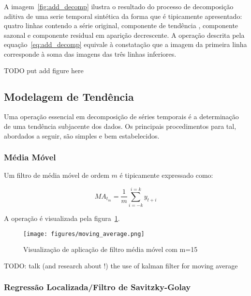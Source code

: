A imagem~\ref{fig:add_decomp} ilustra o resultado do processo de
decomposição aditiva de uma serie temporal sintética da forma que é tipicamente
apresentado: quatro linhas contendo a série original, componente de tendência ,
componente sazonal e componente residual em aparição decrescente. A operação
descrita pela equação~\ref{eq:add_decomp} equivale à constatação que a
imagem da primeira linha corresponde à soma das imagens das três linhas
inferiores.

TODO put add figure here


\subsection{Modelagem de Tendência}

Uma operação essencial em decomposição de séries temporais é a determinação
de uma tendência subjacente dos dados. Os principais procedimentos para tal,
abordados a seguir, são simples e bem estabelecidos.

\subsubsection{Média Móvel}

Um filtro de média móvel de ordem $m$ é tipicamente expressado como:

\begin{equation}\label{eq:ma}
    MA_{t_{m}} = \frac{1}{m} \sum_{i=-k}^{i=k} y_{t+i}
\end{equation}

A operação é visualizada pela figura~\ref{fig:MA}.

\begin{figure}[H]
    \centering
    \texttt{[image: figures/moving\_average.png]}
    \caption{Visualização de aplicação de filtro média móvel com m=15}
    \label{fig:MA}
\end{figure}

TODO: talk (and research about !) the use of kalman filter for moving average

\subsubsection{Regressão Localizada/Filtro de Savitzky-Golay}

